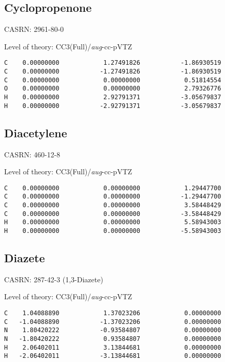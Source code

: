 \documentclass[journal=jctcce,manuscript=article,layout=traditional]{achemso}
\newcommand{\AVTZ}{\emph{aug}-cc-pVTZ}
\begin{document}
\subsection{Cyclopropenone}

CASRN: 2961-80-0

\begin{singlespace}
\noindent Level of theory: CC3(Full)/{\AVTZ}
\begin{verbatim}
C    0.00000000            1.27491826           -1.86930519
C    0.00000000           -1.27491826           -1.86930519
C    0.00000000            0.00000000            0.51814554
O    0.00000000            0.00000000            2.79326776
H    0.00000000            2.92791371           -3.05679837
H    0.00000000           -2.92791371           -3.05679837
\end{verbatim}
\end{singlespace}

\subsection{Diacetylene}

CASRN: 460-12-8

\begin{singlespace}
\noindent Level of theory: CC3(Full)/{\AVTZ}
\begin{verbatim}
C    0.00000000            0.00000000            1.29447700
C    0.00000000            0.00000000           -1.29447700
C    0.00000000            0.00000000            3.58448429
C    0.00000000            0.00000000           -3.58448429
H    0.00000000            0.00000000            5.58943003
H    0.00000000            0.00000000           -5.58943003
\end{verbatim}
\end{singlespace}

\subsection{Diazete}

CASRN: 287-42-3 (1,3-Diazete)

\begin{singlespace}
\noindent Level of theory: CC3(Full)/{\AVTZ}
\begin{verbatim}
C    1.04088890            1.37023206            0.00000000
C   -1.04088890           -1.37023206            0.00000000
N    1.80420222           -0.93584807            0.00000000
N   -1.80420222            0.93584807            0.00000000
H    2.06402011            3.13844681            0.00000000
H   -2.06402011           -3.13844681            0.00000000
\end{verbatim}
\end{singlespace}
\end{document}
